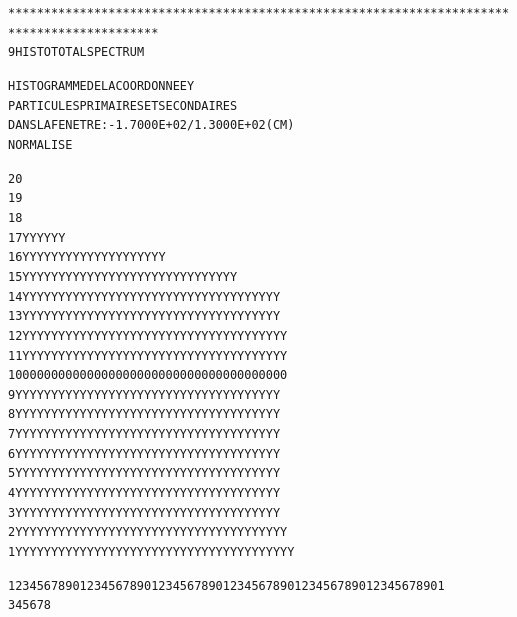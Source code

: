 \begin{alltt}
*******************************************************************************************
      9  HISTO     TOTAL     SPECTRUM

                              HISTOGRAMME  DE  LA  COORDONNEE  Y    
                              PARTICULES  PRIMAIRES  ET  SECONDAIRES
                              DANS  LA  FENETRE :  -1.7000E+02 /   1.3000E+02 (CM) 
                              NORMALISE     

   20                                                                                      
   19                                                                                      
   18                                                                                      
   17                                             Y     YY        Y  Y      Y              
   16                                           Y YYYYY YY YYY  Y YY Y Y  YYYY             
   15                                           Y YYYYY YYYYYYYYYYYYYY YYYYYYYY YY         
   14                                         YYYYYYYYY YYYYYYYYYYYYYYYYYYYYYYYYYYY        
   13                                         YYYYYYYYY YYYYYYYYYYYYYYYYYYYYYYYYYYY        
   12                                         YYYYYYYYYYYYYYYYYYYYYYYYYYYYYYYYYYYYY        
   11                                         YYYYYYYYYYYYYYYYYYYYYYYYYYYYYYYYYYYYY        
   10                                         0000000000000000000000000000000000000        
    9                                         YYYYYYYYYYYYYYYYYYYYYYYYYYYYYYYYYYYYY        
    8                                         YYYYYYYYYYYYYYYYYYYYYYYYYYYYYYYYYYYYY        
    7                                         YYYYYYYYYYYYYYYYYYYYYYYYYYYYYYYYYYYYY        
    6                                         YYYYYYYYYYYYYYYYYYYYYYYYYYYYYYYYYYYYY        
    5                                         YYYYYYYYYYYYYYYYYYYYYYYYYYYYYYYYYYYYY        
    4                                         YYYYYYYYYYYYYYYYYYYYYYYYYYYYYYYYYYYYY        
    3                                         YYYYYYYYYYYYYYYYYYYYYYYYYYYYYYYYYYYYY        
    2                                        YYYYYYYYYYYYYYYYYYYYYYYYYYYYYYYYYYYYYY        
    1                                        YYYYYYYYYYYYYYYYYYYYYYYYYYYYYYYYYYYYYYY       

                              1234567890123456789012345678901234567890123456789012345678901
                                       3         4         5         6         7         8



\end{alltt}

